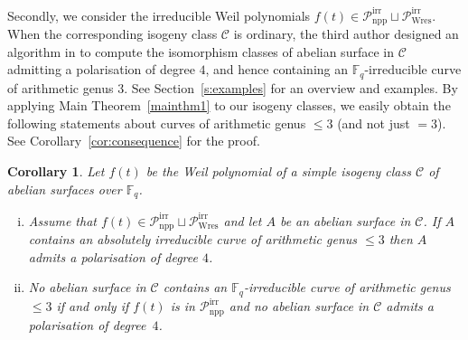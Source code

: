 \documentclass[11pt]{amsart}
\newcommand\Fq{\mathbb{F}_q}
\newcommand\cC{\mathcal{C}}
\theoremstyle{plain}
\newtheorem*{cor_intro}{Corollary}
\theoremstyle{definition}
\newcommand\PirrA{\mathcal{P}^\mathrm{irr}_\mathrm{npp}}
\newcommand\PirrB{\mathcal{P}^\mathrm{irr}_\mathrm{Wres}}
\begin{document}
Secondly, we consider the irreducible Weil polynomials $f(t) \in \PirrA\sqcup\PirrB$.
When the corresponding isogeny class $\cC$ is ordinary, the third author designed an algorithm in \cite{Mar21} to compute the isomorphism classes of abelian surface in $\cC$ admitting a polarisation of degree $4$, and hence containing an $\Fq$-irreducible curve of arithmetic genus $3$.
See Section~\ref{s:examples} for an overview and examples.
By applying Main Theorem~\ref{mainthm1} to our isogeny classes, we easily obtain the following statements about curves of arithmetic genus $\leq 3$ (and not just $=3$).
See Corollary~\ref{cor:consequence} for the proof.
\begin{cor_intro}\label{cor_intro:consequences}
    Let $f(t)$ be the Weil polynomial of a simple isogeny class $\cC$ of abelian surfaces over $\Fq$.
    \begin{enumerate}[(i)]
        \item \label{mainthm1:consequence:1} 
            Assume that $f(t)\in\PirrA\sqcup\PirrB$ and let $A$ be an abelian surface in $\cC$.
            If $A$ contains an absolutely irreducible curve of arithmetic genus $\leq 3$ then $A$ admits a polarisation of degree $4$.
        \item \label{mainthm1:consequence:2}
            No abelian surface in $\cC$ contains an $\Fq$-irreducible curve of arithmetic genus $\leq 3$ if and only if $f(t)$ is in $\PirrA$ and no abelian surface in $\cC$ admits a polarisation of degree~$4$.
    \end{enumerate}      
\end{cor_intro}
\end{document}
